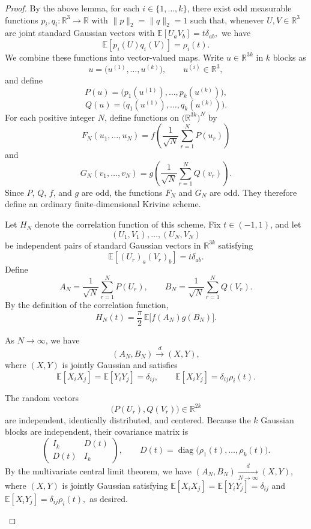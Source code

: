 \begin{proof}
By the above lemma, for each \(i\in\{1,\ldots,k\}\), there exist odd measurable functions 
\(
p_i,q_i:\mathbb{R}^3\to\mathbb{R}
\)
with $\|p\|_2 = \|q\|_2 = 1$ such that, whenever \(U,V\in\mathbb{R}^3\) are joint standard Gaussian vectors with
\(
\mathbb{E}[U_aV_b]=t\delta_{ab},
\)
we have
\[
\mathbb{E}[p_i(U)q_i(V)]
=
\rho_i(t).
\]
We combine these functions into vector-valued maps. Write
\(u\in\mathbb{R}^{3k}\) in \(k\) blocks as
\[
u=\bigl(u^{(1)},\ldots,u^{(k)}\bigr),
\qquad
u^{(i)}\in\mathbb{R}^3,
\]
and define
\[
P(u)
=
\bigl(
p_1(u^{(1)}),\ldots,p_k(u^{(k)})
\bigr),
\]
\[
Q(u)
=
\bigl(
q_1(u^{(1)}),\ldots,q_k(u^{(k)})
\bigr).
\]
For each positive integer \(N\), define functions on
\(\bigl(\mathbb{R}^{3k}\bigr)^N\) by
\[
F_N(u_1,\ldots,u_N)
=
f\left(
\frac{1}{\sqrt{N}}\sum_{r=1}^N P(u_r)
\right)
\]
and
\[
G_N(v_1,\ldots,v_N)
=
g\left(
\frac{1}{\sqrt{N}}\sum_{r=1}^N Q(v_r)
\right).
\]
Since \(P\), \(Q\), \(f\), and \(g\) are odd, the functions \(F_N\) and
\(G_N\) are odd. They therefore define an ordinary finite-dimensional
Krivine scheme.

Let \(H_N\) denote the correlation function of this scheme. Fix
\(t\in(-1,1)\), and let
\[
(U_1,V_1),\ldots,(U_N,V_N)
\]
be independent pairs of standard Gaussian vectors in \(\mathbb{R}^{3k}\)
satisfying
\[
\mathbb{E}[(U_r)_a(V_r)_b]
=
t\delta_{ab}.
\]
Define
\[
A_N
=
\frac{1}{\sqrt{N}}\sum_{r=1}^N P(U_r),
\qquad
B_N
=
\frac{1}{\sqrt{N}}\sum_{r=1}^N Q(V_r).
\]
By the definition of the correlation function,
\[
H_N(t)
=
\frac{\pi}{2}\,
\mathbb{E}\bigl[f(A_N)g(B_N)\bigr].
\]

\begin{claim}
As \(N \rightarrow \infty\), we have \[
(A_N,B_N)
\xrightarrow{d}
(X,Y),
\]
where \((X,Y)\) is jointly Gaussian and satisfies
\[
\mathbb{E}[X_iX_j]
=
\mathbb{E}[Y_iY_j]
=
\delta_{ij},
\qquad
\mathbb{E}[X_iY_j]
=
\delta_{ij}\rho_i(t).
\]
\end{claim}

\begin{claimproof}
The random vectors
\[
\bigl(P(U_r),Q(V_r)\bigr)\in\mathbb{R}^{2k}
\]
are independent, identically distributed, and centered. Because the
\(k\) Gaussian blocks are independent, their covariance matrix is
\[
\begin{pmatrix}
I_k & D(t)\\
D(t) & I_k
\end{pmatrix},
\qquad
D(t)
=
\operatorname{diag}\bigl(
\rho_1(t),\ldots,\rho_k(t)
\bigr).
\]
By the multivariate central limit theorem, we have
\(
(A_N,B_N)
\xrightarrow[N\to\infty]{d}
(X,Y),
\)
where \((X,Y)\) is jointly Gaussian satisfying
\(
\mathbb{E}[X_iX_j]
=
\mathbb{E}[Y_iY_j]
=
\delta_{ij}\) and 
\(
\mathbb{E}[X_iY_j]
=
\delta_{ij}\rho_i(t),
\)
as desired. 
\end{claimproof}


\end{proof}

